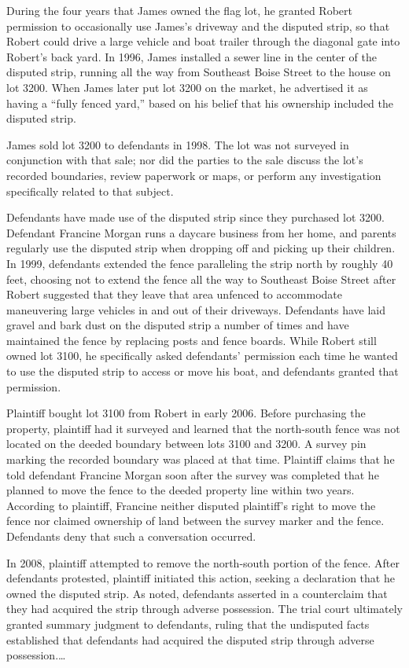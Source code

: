 During the four years that James owned the flag lot, he granted Robert
permission to occasionally use James's driveway and the disputed strip, so that
Robert could drive a large vehicle and boat trailer through the diagonal gate
into Robert's back yard. In 1996, James installed a sewer line in the center of
the disputed strip, running all the way from Southeast Boise Street to the
house on lot 3200. When James later put lot 3200 on the market, he advertised
it as having a ``fully fenced yard,'' based on his belief that his ownership
included the disputed strip.

James sold lot 3200 to defendants in 1998. The lot was not surveyed in
conjunction with that sale; nor did the parties to the sale discuss the lot's
recorded boundaries, review paperwork or maps, or perform any investigation
specifically related to that subject.

Defendants have made use of the disputed strip since they purchased lot 3200.
Defendant Francine Morgan runs a daycare business from her home, and parents
regularly use the disputed strip when dropping off and picking up their
children. In 1999, defendants extended the fence paralleling the strip north by
roughly 40 feet, choosing not to extend the fence all the way to Southeast
Boise Street after Robert suggested that they leave that area unfenced to
accommodate maneuvering large vehicles in and out of their driveways.
Defendants have laid gravel and bark dust on the disputed strip a number of
times and have maintained the fence by replacing posts and fence boards. While
Robert still owned lot 3100, he specifically asked defendants' permission each
time he wanted to use the disputed strip to access or move his boat, and
defendants granted that permission.

Plaintiff bought lot 3100 from Robert in early 2006. Before purchasing the
property, plaintiff had it surveyed and learned that the north-south fence was
not located on the deeded boundary between lots 3100 and 3200. A survey pin
marking the recorded boundary was placed at that time. Plaintiff claims that he
told defendant Francine Morgan soon after the survey was completed that he
planned to move the fence to the deeded property line within two years.
According to plaintiff, Francine neither disputed plaintiff's right to move the
fence nor claimed ownership of land between the survey marker and the fence.
Defendants deny that such a conversation occurred.

In 2008, plaintiff attempted to remove the north-south portion of the fence.
After defendants protested, plaintiff initiated this action, seeking a
declaration that he owned the disputed strip. As noted, defendants asserted in
a counterclaim that they had acquired the strip through adverse possession. The
trial court ultimately granted summary judgment to defendants, ruling that the
undisputed facts established that defendants had acquired the disputed strip
through adverse possession.\ldots

